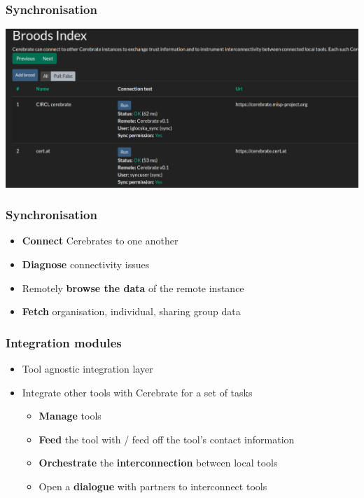 \begin{frame}
\frametitle{Synchronisation}
\begin{center}
    \includegraphics[scale=0.4]{sync.png}
\end{center}
\end{frame}

\begin{frame}
	\frametitle{Synchronisation}
	\begin{itemize}
                \item {\bf Connect} Cerebrates to one another
                \item {\bf Diagnose} connectivity issues
                \item Remotely {\bf browse the data} of the remote instance
                \item {\bf Fetch} organisation, individual, sharing group data
	\end{itemize}
\end{frame}

\begin{frame}
	\frametitle{Integration modules}
	\begin{itemize}
                \item Tool agnostic integration layer
                \item Integrate other tools with Cerebrate for a set of tasks
         	\begin{itemize}
		        \item {\bf Manage} tools
		        \item {\bf Feed} the tool with / feed off the tool's contact information
                        \item {\bf Orchestrate} the {\bf interconnection} between local tools
                        \item Open a {\bf dialogue} with partners to interconnect tools
		\end{itemize}
	\end{itemize}
\end{frame}

